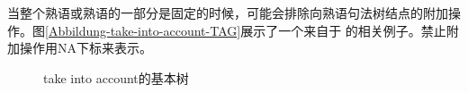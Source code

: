 
当整个熟语或熟语的一部分是固定的时候，可能会排除向熟语句法树结点的附加操作。图\vref{Abbildung-take-into-account-TAG}展示了一个来自于 \citet[]{AS89a}的相关例子。禁止附加操作用NA下标来表示。
\begin{figure}
\centering
{}
\caption{\label{Abbildung-take-into-account-TAG}take into account的基本树}
\end{figure}%

